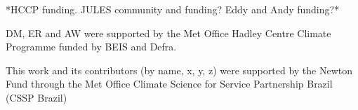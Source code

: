 \documentclass[gmd, manuscript]{copernicus}
\begin{document}
\appendixtables   %







\begin{acknowledgements}
*HCCP funding. JULES community and funding? Eddy and Andy funding?*

DM, ER and AW were supported by the Met Office Hadley Centre Climate Programme funded by BEIS and Defra.

This work and its contributors (by name, x, y, z) were supported by the Newton Fund through the Met Office Climate Science for Service Partnership Brazil (CSSP Brazil)


\end{acknowledgements}











 


\end{document}
